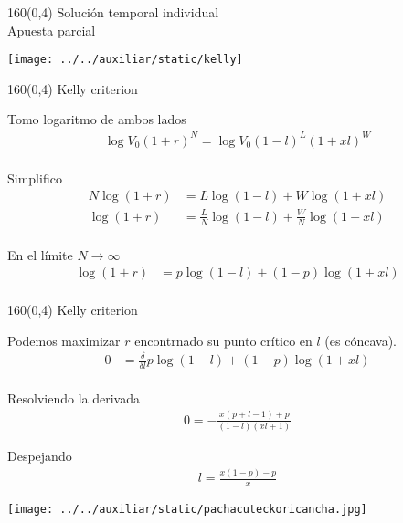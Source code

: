 \documentclass[shownotes,aspectratio=169]{beamer}
\begin{document}
\begin{frame}[plain]
 \begin{textblock}{160}(0,4)
  \centering \Large Solución temporal individual \\ \normalsize Apuesta parcial
 \end{textblock}

 \centering
\vspace{1cm}
 
\texttt{[image: ../../auxiliar/static/kelly]}

 
\end{frame}

\begin{frame}[plain]
 \begin{textblock}{160}(0,4)
  \centering \Large Kelly criterion
 \end{textblock}
\vspace{1.3cm}
 
Tomo logaritmo de ambos lados
\begin{align*}
 \log V_0 (1+r)^N = \log V_0 (1-l)^L (1+xl)^W \\
\end{align*}

\pause

Simplifico
\begin{align*}
 N \log (1+r) &= L \log (1-l) + W \log (1+xl) \\
 \log (1+r) &= \frac{L}{N} \log (1-l) + \frac{W}{N} \log (1+xl) \\
\end{align*}

\pause

En el límite $N \rightarrow \infty$
\begin{align*}
 \log (1+r) &= p \log (1-l) + (1-p) \log (1+xl) \\
\end{align*}

\end{frame}

\begin{frame}[plain]
\begin{textblock}{160}(0,4)
  \centering \Large Kelly criterion
 \end{textblock}
\vspace{1.3cm}
 

Podemos maximizar $r$ encontrnado su punto crítico en $l$ (es cóncava).
\begin{align*}
0 &= \frac{\delta}{\delta l} p \log (1-l) + (1-p) \log (1+xl) \\
\end{align*}

\pause

Resolviendo la derivada
\begin{align*}
0 = - \frac{x (p+l-1) + p}{(1-l)(xl+1)}
\end{align*}

\pause

Despejando
\begin{align*}
 l = \frac{x(1 - p) - p}{x}
\end{align*}
 
\end{frame}


 
\begin{frame}[plain]
\centering
  \texttt{[image: ../../auxiliar/static/pachacuteckoricancha.jpg]}
\end{frame}
\end{document}

